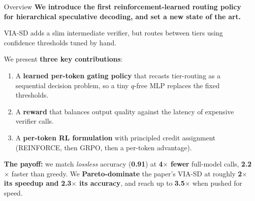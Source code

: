 \documentclass[aspectratio=169,11pt]{beamer}
\begin{document}
\begin{frame}{Overview}
\textbf{We introduce the first reinforcement-learned routing policy for hierarchical speculative decoding, and set a new state of the art.}
\vspace{6pt}

{\footnotesize VIA-SD adds a slim intermediate verifier, but routes between tiers using confidence thresholds tuned by hand.}
\vspace{4pt}

We present \textbf{three key contributions}:
\begin{enumerate}
  \item A \textbf{learned per-token gating policy} that recasts tier-routing as a sequential decision problem, so a tiny $q$-free MLP replaces the fixed thresholds.
  \item A \textbf{reward} that balances output quality against the latency of expensive verifier calls.
  \item A \textbf{per-token RL formulation} with principled credit assignment (REINFORCE, then GRPO, then a per-token advantage).
\end{enumerate}
\vspace{2pt}
{\footnotesize\textbf{The payoff:} we match \emph{lossless} accuracy (\textbf{0.91}) at \textbf{4$\times$ fewer} full-model calls,
\textbf{2.2$\times$} faster than greedy. We \textbf{Pareto-dominate} the paper's VIA-SD at roughly \textbf{2$\times$ its speedup and 2.3$\times$ its accuracy},
and reach up to \textbf{3.5$\times$} when pushed for speed.}
\end{frame}
\end{document}
